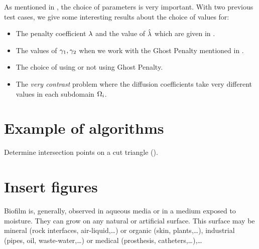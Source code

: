 \documentclass[../main.tex]{subfiles}
\begin{document}
As mentioned in , the choice of parameters is very important. With two previous test cases, we give some interesting results about the choice of values for:

\begin{itemize}
\item The penalty coefficient $\lambda$ and the value of $\hat{\lambda}$ which are given in .
\item The values of $\gamma_1, \gamma_2$ when we work with the Ghost Penalty mentioned in .
\item The choice of using or not using Ghost Penalty.
\item The \textit{very contrast} problem where the diffusion coefficients take very different values in each subdomain $\Omega_i$.
\end{itemize}

\section{Example of algorithms}

\begin{algorithm}
  \BlankLine
  \BlankLine
  \caption{Determine intersection points on a cut triangle ().}
  \label{alg:inter-points}
\end{algorithm}

\section{Insert figures}

 Biofilm is, generally, observed in aqueous media or in a medium exposed to moisture. They can grow on any natural or artificial surface. This surface may be mineral (rock interfaces, air-liquid,\ldots) or organic (skin, plants,\ldots), industrial (pipes, oil, waste-water,\ldots) or medical (prosthesis, catheters,\ldots),\ldots
\end{document}
